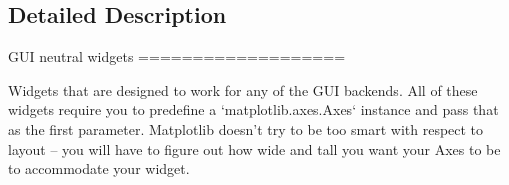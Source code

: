 \subsection{Detailed Description}
\begin{DoxyVerb}GUI neutral widgets
===================

Widgets that are designed to work for any of the GUI backends.
All of these widgets require you to predefine a `matplotlib.axes.Axes`
instance and pass that as the first parameter.  Matplotlib doesn't try to
be too smart with respect to layout -- you will have to figure out how
wide and tall you want your Axes to be to accommodate your widget.
\end{DoxyVerb}
 